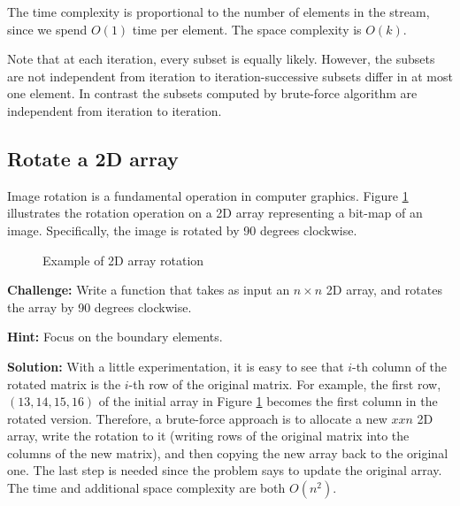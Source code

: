 \documentclass[11pt,a4paper]{article}
\begin{document}
The time complexity is proportional to the number of elements in the stream,
since we spend $O(1)$ time per element. The space complexity is $O(k)$.

Note that at each iteration, every subset is equally likely. However, the
subsets are not independent from iteration to iteration-successive subsets
differ in at most one element. In contrast the subsets computed by brute-force
algorithm are independent from iteration to iteration.

\subsection{Rotate a 2D array}

Image rotation is a fundamental operation in computer graphics. Figure
\ref{fig:matrix} illustrates the rotation operation on a 2D array
representing a bit-map of an image. Specifically, the image is rotated by 90
degrees clockwise.

\begin{figure}[hb]
\centering
{}
\caption{Example of 2D array rotation}
\label{fig:matrix}
\end{figure}

\textbf{Challenge:} Write a function that takes as input an $n\times n$ 2D
array, and rotates the array by 90 degrees clockwise.

\textbf{Hint:} Focus on the boundary elements.

\textbf{Solution:} With a little experimentation, it is easy to see that
$i$-th column of the rotated matrix is the $i$-th row of the original matrix.
For example, the first row, $(13,14,15,16)$ of the initial array in Figure
\ref{fig:matrix} becomes the first column in the rotated version. Therefore, a
brute-force approach is to allocate a new $x x n$ 2D array, write the rotation
to it (writing rows of the original matrix into the columns of the new
matrix), and then copying the new array back to the original one. The last
step is needed since the problem says to update the original array. The time
and additional space complexity are both $O(n^2)$.
\end{document}
